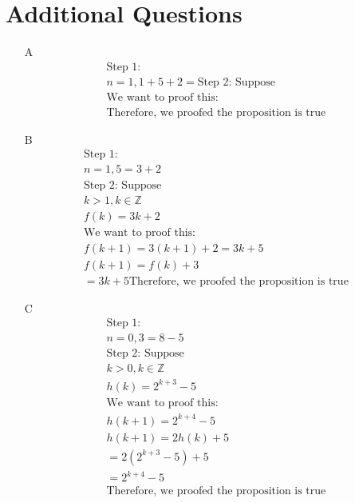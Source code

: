 \documentclass[12pt]{article}
\begin{document}
\section*{Additional Questions}
\begin{itemize}
    \item [A] 
	\begin{equation*}
		\begin{split}
		    \text{Step 1:}\\
		    n = 1, 1 + 5 +2 = 
		    \text{Step 2: Suppose}\\
		    \text{We want to proof this:}\\
		    \text{Therefore, we proofed the proposition is true}
		\end{split}
	\end{equation*}
    \item [B] 
	\begin{equation*}
		\begin{split}
		    \text{Step 1:}\\
		    n = 1, 5 = 3+2\\
		    \text{Step 2: Suppose}\\
		    k > 1, k \in \mathbb{Z}\\
		    f(k) = 3k+2\\
		    \text{We want to proof this:}\\
		    f(k+1) = 3(k+1)+2 = 3k + 5\\
		    f(k+1) = f(k) + 3\\
		    = 3k+5
		    \text{Therefore, we proofed the proposition is true}
		\end{split}
	\end{equation*}
    \item [C] 
	\begin{equation*}
		\begin{split}
		    \text{Step 1:}\\
		    n = 0, 3 = 8-5\\
		    \text{Step 2: Suppose}\\
		    k > 0, k \in \mathbb{Z }\\
		    h(k) = 2^{k+3}-5\\
		    \text{We want to proof this:}\\
		    h(k+1) = 2^{k+4}-5\\
		    h(k+1) = 2h(k) + 5\\
		    = 2(2^{k+3} -5) + 5\\
		    = 2^{k+4} - 5\\
		    \text{Therefore, we proofed the proposition is true}

\end{split}
\end{equation*}
\end{itemize}
\end{document}
